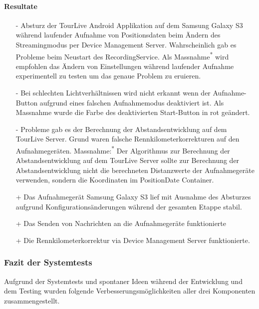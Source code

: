 \paragraph*{Resultate}
\begin{itemize}
	\item[-] Absturz der TourLive Android Applikation auf dem Samsung Galaxy S3 während laufender Aufnahme von Positionsdaten beim Ändern des Streamingmodus per Device Management Server. Wahrscheinlich gab es Probleme beim Neustart des RecordingService. Als Massnahme\textsuperscript{*} wird empfohlen das Ändern von Einstellungen während laufender Aufnahme experimentell zu testen um das genaue Problem zu eruieren. 
	\item[-] Bei schlechten Lichtverhältnissen wird nicht erkannt wenn der Aufnahme-Button aufgrund eines falschen Aufnahmemodus deaktiviert ist. Als Massnahme wurde die Farbe des deaktivierten Start-Button in rot geändert.
	\item[-] Probleme gab es der Berechnung der Abstandsentwicklung auf dem TourLive Server. Grund waren falsche Rennkilometerkorrekturen auf den Aufnahmegeräten. Massnahme:\textsuperscript{*} Der Algorithmus zur Berechnung der Abstandsentwicklung auf dem TourLive Server sollte zur Berechnung der Abstandsentwicklung nicht die berechneten Distanzwerte der Aufnahmegeräte verwenden, sondern die Koordinaten im PositionDate Container.
	\item[+] Das Aufnahmegerät Samsung Galaxy S3 lief mit Ausnahme des Absturzes aufgrund Konfigurationsänderungen während der gesamten Etappe stabil. 
	\item[+] Das Senden von Nachrichten an die Aufnahmegeräte funktionierte
	\item[+] Die Rennkilometerkorrektur via Device Management Server funktionierte.
\end{itemize}

\subsubsection{Fazit der Systemtests}
\label{sec:fazitsystemtests}

Aufgrund der Systemtests und spontaner Ideen während der Entwicklung und dem Testing wurden folgende Verbesserungsmöglichkeiten aller drei Komponenten zusammengestellt.
